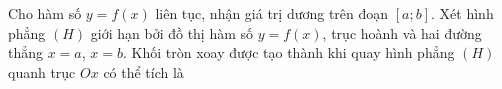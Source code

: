 \begin{ex}
Cho hàm số $y=f(x)$ liên tục, nhận giá trị dương trên đoạn $[a;b]$. Xét hình phẳng $(H)$ giới hạn bởi đồ thị hàm số $y=f(x)$, trục hoành và hai đường thẳng $x=a$, $x=b$. Khối tròn xoay được tạo thành khi quay hình phẳng $(H)$ quanh trục $Ox$ có thể tích là
\end{ex}
